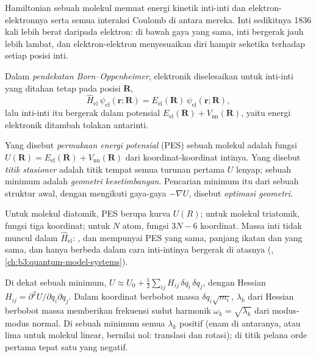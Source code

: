 Hamiltonian sebuah molekul memuat energi kinetik inti-inti dan
elektron-elektronnya serta semua interaksi Coulomb di antara mereka. Inti
sedikitnya 1836 kali lebih berat daripada elektron: di bawah gaya yang sama,
inti bergerak jauh lebih lambat, dan elektron-elektron menyesuaikan diri
hampir seketika terhadap setiap posisi inti.

\begin{definition}\label{def:b3:computational-chemistry:born-oppenheimer}
Dalam \emph{pendekatan Born--Oppenheimer},
 elektronik diselesaikan untuk inti-inti yang ditahan
tetap pada posisi $\mathbf R$,
\[
\hat H_{\mathrm{el}}\,\psi_{\mathrm{el}}(\mathbf r;\mathbf R) =
E_{\mathrm{el}}(\mathbf R)\,\psi_{\mathrm{el}}(\mathbf r;\mathbf R),
\]
lalu inti-inti itu bergerak dalam potensial $E_{\mathrm{el}}(\mathbf R) +
V_{\mathrm{nn}}(\mathbf R)$, yaitu energi elektronik ditambah tolakan
antarinti.
\end{definition}

\begin{definition}\label{def:b3:computational-chemistry:pes}
Yang disebut \emph{permukaan energi potensial}
(PES) sebuah molekul adalah fungsi $U(\mathbf R) = E_{\mathrm{el}}(\mathbf R) +
V_{\mathrm{nn}}(\mathbf R)$ dari koordinat-koordinat intinya. Yang disebut
\emph{titik stasioner} adalah titik tempat semua
turunan pertama $U$ lenyap; sebuah minimum adalah \emph{geometri
kesetimbangan}. Pencarian minimum itu dari
sebuah struktur awal, dengan mengikuti gaya-gaya $-\nabla U$, disebut
\emph{optimasi geometri}.
\end{definition}

Untuk molekul diatomik, PES berupa kurva $U(R)$; untuk molekul triatomik,
fungsi tiga koordinat; untuk $N$ atom, fungsi $3N - 6$ koordinat. Massa inti
tidak muncul dalam $\hat H_{\mathrm{el}}$: ,  dan 
mempunyai PES yang sama, panjang ikatan dan  yang sama, dan
hanya berbeda dalam cara inti-intinya bergerak di atasnya (,
\cref{ch:b3:quantum-model-systems}).

\begin{proposition}\label{prop:b3:computational-chemistry:hessian}
Di dekat sebuah minimum, $U \approx U_0 + \frac12\sum_{ij}H_{ij}\,\delta q_i\,\delta q_j$,
dengan Hessian $H_{ij} = \partial^2U/\partial q_i\partial q_j$. Dalam koordinat
berbobot massa $\delta q_i\sqrt{m_i}$,  $\lambda_k$ dari
Hessian berbobot massa memberikan frekuensi sudut harmonik $\omega_k =
\sqrt{\lambda_k}$ dari modus-modus normal. Di sebuah minimum semua
$\lambda_k$ positif (enam di antaranya, atau lima untuk molekul linear,
bernilai nol: translasi dan rotasi); di titik pelana orde pertama tepat satu
yang negatif.
\end{proposition}

